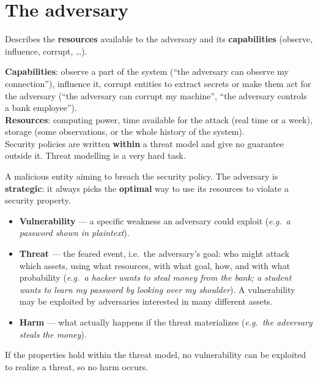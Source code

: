 \section{The adversary}

\begin{defnbox}[title=Threat model]
Describes the \textbf{resources} available to the adversary and its \textbf{capabilities}
(observe, influence, corrupt, \ldots).
\end{defnbox}

\begin{exbox}[title=Capabilities and resources]
\textbf{Capabilities}: observe a part of the system (``the adversary can observe my
connection''), influence it, corrupt entities to extract secrets or make them act for the
adversary (``the adversary can corrupt my machine'', ``the adversary controls a bank
employee''). \\
\textbf{Resources}: computing power, time available for the attack (real time or a week),
storage (some observations, or the whole history of the system). \\
Security policies are written \textbf{within} a threat model and give no guarantee outside it.
Threat modelling is a very hard task.
\end{exbox}

\begin{defnbox}[title=Adversary]
A malicious entity aiming to breach the security policy. The adversary is
\textbf{strategic}: it always picks the \textbf{optimal} way to use its resources to
violate a security property.
\end{defnbox}

\begin{rembox}[title=Key vocabulary]
\begin{itemize}
  \item \textbf{Vulnerability} — a specific weakness an adversary could exploit (\textit{e.g.\ a password shown in plaintext}).
  \item \textbf{Threat} — the feared event, i.e.\ the adversary's goal: who might attack which assets, using what resources, with what goal, how, and with what probability (\textit{e.g.\ a hacker wants to steal money from the bank; a student wants to learn my password by looking over my shoulder}). A vulnerability may be exploited by adversaries interested in many different assets.
  \item \textbf{Harm} — what actually happens if the threat materializes (\textit{e.g.\ the adversary steals the money}).
\end{itemize}
If the properties hold within the threat model, no vulnerability can be exploited to
realize a threat, so no harm occurs.
\end{rembox}

